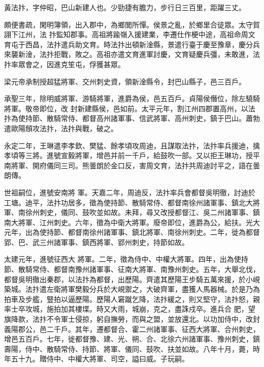 
\begin{pinyinscope}

 黃法抃，字仲昭，巴山新建人也。少勁捷有膽力，步行日三百里，距躍三丈。



 頗便書疏，閑明簿領，出入郡中，為鄉閭所憚。侯景之亂，於鄉里合徒眾。太守賀詡下江州，法
 抃監知郡事。高祖將踰嶺入援建業，李遷仕作梗中途，高祖命周文育屯于西昌，法抃遣兵助文育。時法抃出頓新淦縣，景遣行臺于慶至豫章，慶分兵來襲新淦，法抃拒戰，敗之。高祖亦遣文育進軍討慶，文育疑慶兵彊，未敢進，法抃率眾會之，因進克笙屯，俘獲甚眾。



 梁元帝承制授超猛將軍、交州刺史資，領新淦縣令，封巴山縣子，邑三百戶。



 承聖三年，除明威將軍、游騎將軍，進爵為侯，邑五百戶。貞陽侯僭位，除左驍騎將軍。敬帝即位，改
 封新建縣侯，邑如前。太平元年，割江州四郡置高州，以法抃為使持節、散騎常侍、都督高州諸軍事、信武將軍、高州刺史，鎮于巴山。蕭勃遣歐陽頠攻法抃，法抃與戰，破之。



 永定二年，王琳遣李孝欽、樊猛、餘孝頃攻周迪，且謀取法抃，法抃率兵援迪，擒孝頃等三將。進號宣毅將軍，增邑并前一千戶，給鼓吹一部。又以拒王琳功，授平南將軍、開府儀同三司。熊曇朗於金口反，害周文育，法抃共周迪討平之，語在曇朗傳。



 世祖嗣位，進號安南將
 軍。天嘉二年，周迪反，法抃率兵會都督吳明徹，討迪於工塘。迪平，法抃功居多，徵為使持節、散騎常侍、都督南徐州諸軍事、鎮北大將軍、南徐州刺史，儀同、鼓吹並如故。未拜，尋又改授都督江、吳二州諸軍事、鎮南大將軍、江州刺史。六年，徵為中衛大將軍。廢帝即位，進爵為公，給扶。光大元年，出為使持節、都督南徐州諸軍事、鎮北將軍、南徐州刺史。二年，徙為都督郢、巴、武三州諸軍事、鎮西將軍、郢州刺史，持節如故。



 太建元年，進號征西大
 將軍。二年，徵為侍中、中權大將軍。四年，出為使持節、散騎常侍、都督南豫州諸軍事、征南大將軍、南豫州刺史。五年，大舉北伐，都督吳明徹出秦郡，以法抃為都督，出歷陽。齊遣其歷陽王步騎五萬來援，於小峴築城。法抃遣左衛將軍樊毅分兵於大峴禦之，大破齊軍，盡獲人馬器械。於是乃為拍車及步艦，豎拍以逼歷陽。歷陽人窘蹴乞降，法抃緩之，則又堅守，法抃怒，親率士卒攻城，施拍加其樓堞。時又大雨，城崩，克之，盡誅戍卒。進兵合
 肥，望旗降款，法抃不令軍士侵掠，躬自撫勞，而與之盟，並放還北。以功加侍中，改封義陽郡公，邑二千戶。其年，遷都督合、霍二州諸軍事、征西大將軍、合州刺史，增邑五百戶。七年，徙都督豫、建、光、朔、合、北徐六州諸軍事、豫州刺史，鎮壽陽，侍中、散騎常侍、持節、將軍、儀同、鼓吹、扶並如故。八年十月，薨，時年五十九。贈侍中、中權大將軍、司空，謚曰威。子玩嗣。




\end{pinyinscope}
